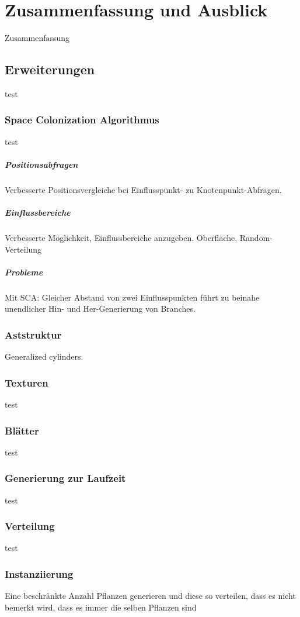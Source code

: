 \chapter{Zusammenfassung und Ausblick}

Zusammenfassung

\section{Erweiterungen}
test
\subsection{Space Colonization Algorithmus}
test
\paragraph{Positionsabfragen}
Verbesserte Positionsvergleiche bei Einflusspunkt- zu Knotenpunkt-Abfragen.

\paragraph{Einflussbereiche} 
Verbesserte Möglichkeit, Einflussbereiche anzugeben. Oberfläche, Random-Verteilung

\paragraph{Probleme}
Mit SCA: Gleicher Abstand von zwei Einflusspunkten führt zu beinahe unendlicher Hin- und Her-Generierung von Branches.

\subsection{Aststruktur}

Generalized cylinders.

\subsection{Texturen}
test
\subsection{Blätter}
test
\subsection{Generierung zur Laufzeit}
test
\subsection{Verteilung}
test
\subsection{Instanziierung}
Eine beschränkte Anzahl Pflanzen generieren und diese so verteilen, dass es nicht bemerkt wird, dass es immer die selben Pflanzen sind

